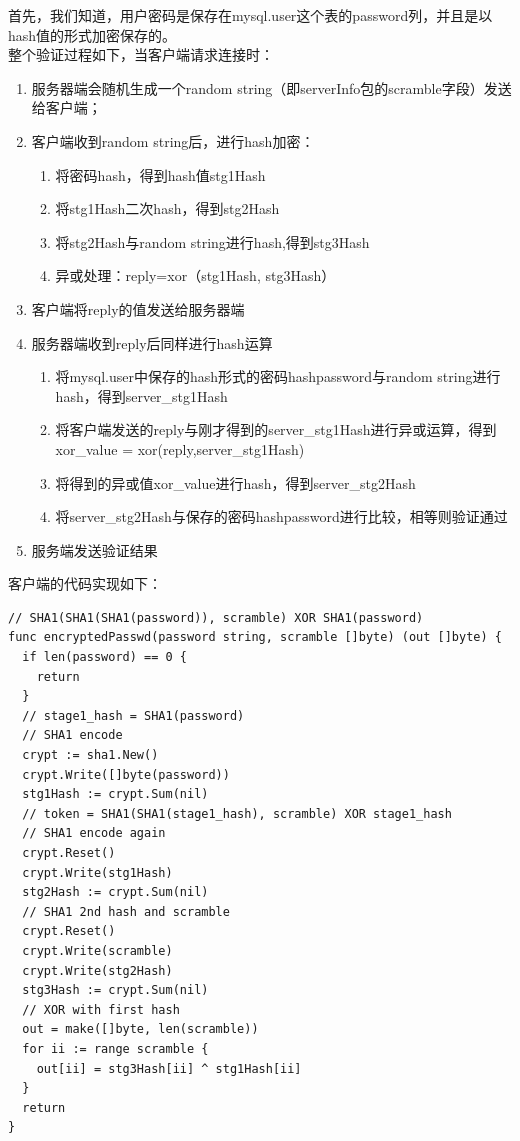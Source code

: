 \documentclass[a4paper, titlepage, 10pt, bookmark]{article}
\begin{document}
首先，我们知道，用户密码是保存在mysql.user这个表的password列，并且是以hash值的形式加密保存的。\\

整个验证过程如下，当客户端请求连接时：
\begin{enumerate}
    \item 服务器端会随机生成一个random string（即serverInfo包的scramble字段）发送给客户端；
    \item 客户端收到random string后，进行hash加密：
    \begin{enumerate}
      \item 将密码hash，得到hash值stg1Hash
      \item 将stg1Hash二次hash，得到stg2Hash
      \item 将stg2Hash与random string进行hash,得到stg3Hash
      \item 异或处理：reply=xor（stg1Hash, stg3Hash）
    \end{enumerate}
    \item 客户端将reply的值发送给服务器端
    \item 服务器端收到reply后同样进行hash运算
    \begin{enumerate}
      \item 将mysql.user中保存的hash形式的密码hashpassword与random string进行hash，得到server\_stg1Hash
      \item 将客户端发送的reply与刚才得到的server\_stg1Hash进行异或运算，得到xor\_value = xor(reply,server\_stg1Hash)
      \item 将得到的异或值xor\_value进行hash，得到server\_stg2Hash
      \item 将server\_stg2Hash与保存的密码hashpassword进行比较，相等则验证通过
    \end{enumerate}
    \item 服务端发送验证结果
\end{enumerate}

客户端的代码实现如下：
\begin{spacing}{1.0}
\begin{lstlisting}
// SHA1(SHA1(SHA1(password)), scramble) XOR SHA1(password)
func encryptedPasswd(password string, scramble []byte) (out []byte) {
  if len(password) == 0 {
    return
  }
  // stage1_hash = SHA1(password)
  // SHA1 encode
  crypt := sha1.New()
  crypt.Write([]byte(password))
  stg1Hash := crypt.Sum(nil)
  // token = SHA1(SHA1(stage1_hash), scramble) XOR stage1_hash
  // SHA1 encode again
  crypt.Reset()
  crypt.Write(stg1Hash)
  stg2Hash := crypt.Sum(nil)
  // SHA1 2nd hash and scramble
  crypt.Reset()
  crypt.Write(scramble)
  crypt.Write(stg2Hash)
  stg3Hash := crypt.Sum(nil)
  // XOR with first hash
  out = make([]byte, len(scramble))
  for ii := range scramble {
    out[ii] = stg3Hash[ii] ^ stg1Hash[ii]
  }
  return
}
\end{lstlisting}
\end{spacing}
\end{document}
